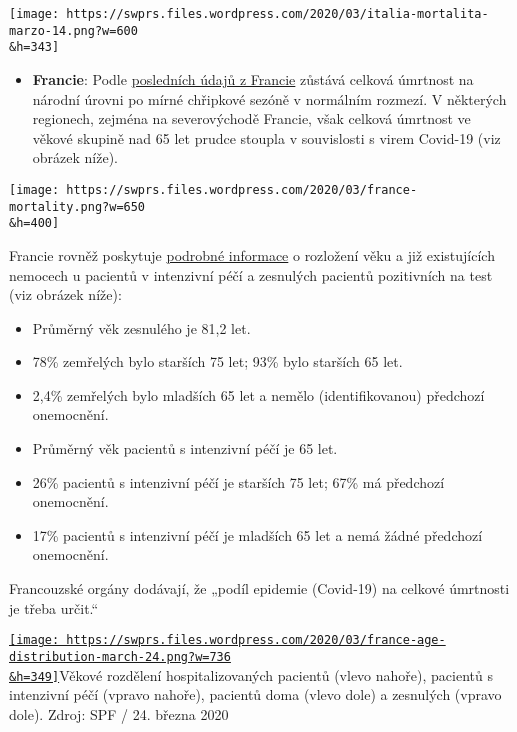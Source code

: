 \texttt{[image: https://swprs.files.wordpress.com/2020/03/italia-mortalita-marzo-14.png?w=600\\\&h=343]}

\begin{itemize}
\tightlist
\item
  \textbf{Francie}: Podle
  \href{https://www.santepubliquefrance.fr/maladies-et-traumatismes/maladies-et-infections-respiratoires/infection-a-coronavirus/documents/bulletin-national/covid-19-point-epidemiologique-du-24-mars-2020}{posledních
  údajů z Francie} zůstává celková úmrtnost na národní úrovni po mírné
  chřipkové sezóně v normálním rozmezí. V některých regionech, zejména
  na severovýchodě Francie, však celková úmrtnost ve věkové skupině nad
  65 let prudce stoupla v souvislosti s virem Covid-19 (viz obrázek
  níže).
\end{itemize}

\texttt{[image: https://swprs.files.wordpress.com/2020/03/france-mortality.png?w=650\\\&h=400]}

Francie rovněž poskytuje
\href{https://www.santepubliquefrance.fr/maladies-et-traumatismes/maladies-et-infections-respiratoires/infection-a-coronavirus/documents/bulletin-national/covid-19-point-epidemiologique-du-24-mars-2020}{podrobné
informace} o rozložení věku a již existujících nemocech u pacientů v
intenzivní péčí a zesnulých pacientů pozitivních na test (viz obrázek
níže):

\begin{itemize}
\tightlist
\item
  Průměrný věk zesnulého je 81,2 let.
\item
  78\% zemřelých bylo starších 75 let; 93\% bylo starších 65 let.
\item
  2,4\% zemřelých bylo mladších 65 let a nemělo (identifikovanou)
  předchozí onemocnění.
\item
  Průměrný věk pacientů s intenzivní péčí je 65 let.
\item
  26\% pacientů s intenzivní péčí je starších 75 let; 67\% má předchozí
  onemocnění.
\item
  17\% pacientů s intenzivní péčí je mladších 65 let a nemá žádné
  předchozí onemocnění.
\end{itemize}

Francouzské orgány dodávají, že „podíl epidemie (Covid-19) na celkové
úmrtnosti je třeba určit.``

\href{https://swprs.files.wordpress.com/2020/03/france-age-distribution-march-24.png}{\texttt{[image: https://swprs.files.wordpress.com/2020/03/france-age-distribution-march-24.png?w=736\\\&h=349]}}Věkové
rozdělení hospitalizovaných pacientů (vlevo nahoře), pacientů s
intenzivní péčí (vpravo nahoře), pacientů doma (vlevo dole) a zesnulých
(vpravo dole). Zdroj: SPF / 24. března 2020

